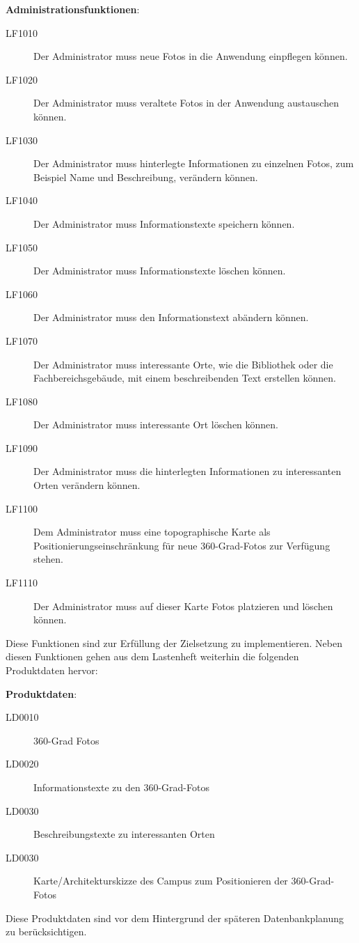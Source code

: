 \textbf{Administrationsfunktionen}:

\begin{description}
  \item[LF1010] Der Administrator muss neue Fotos in die Anwendung einpflegen
  können.
  \item[LF1020] Der Administrator muss veraltete Fotos in der Anwendung
  austauschen können.
  \item[LF1030] Der Administrator muss hinterlegte Informationen zu einzelnen
  Fotos, zum Beispiel Name und Beschreibung, verändern können.
  \item[LF1040] Der Administrator muss Informationstexte speichern können.
  \item[LF1050] Der Administrator muss Informationstexte löschen können.
  \item[LF1060] Der Administrator muss den Informationstext abändern können.
  \item[LF1070] Der Administrator muss interessante Orte, wie die Bibliothek
  oder die Fachbereichsgebäude, mit einem beschreibenden Text erstellen können.
  \item[LF1080] Der Administrator muss interessante Ort löschen können.
  \item[LF1090] Der Administrator muss die hinterlegten Informationen zu
  interessanten Orten verändern können.
  \item[LF1100] Dem Administrator muss eine topographische Karte als
  Positionierungseinschränkung für neue 360-Grad-Fotos zur Verfügung stehen.
  \item[LF1110] Der Administrator muss auf dieser Karte Fotos platzieren und
  löschen können.
\end{description}

Diese Funktionen sind zur Erfüllung der Zielsetzung zu implementieren. Neben
diesen Funktionen gehen aus dem Lastenheft weiterhin die folgenden Produktdaten
hervor:

\textbf{Produktdaten}:

\begin{description}
  \item[LD0010] 360-Grad Fotos
  \item[LD0020] Informationstexte zu den 360-Grad-Fotos
  \item[LD0030] Beschreibungstexte zu interessanten Orten
  \item[LD0030] Karte/Architekturskizze des Campus zum Positionieren der
  360-Grad-Fotos
\end{description}

Diese Produktdaten sind vor dem Hintergrund der späteren Datenbankplanung zu
berücksichtigen.